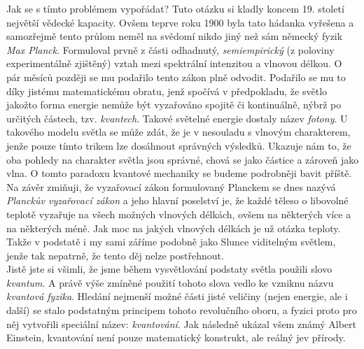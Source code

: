 \documentclass{../../../../style/mkimain}
\begin{document}
Jak se s tímto problémem vypořádat? Tuto otázku si kladly koncem 19. století největší vědecké kapacity.
Ovšem teprve roku 1900 byla tato hádanka vyřešena a samozřejmě tento průlom neměl na svědomí nikdo jiný než sám německý fyzik \textit{Max Planck}.
Formuloval prvně z části odhadnutý, \textit{semiempirický} (z poloviny experimentálně zjištěný) vztah mezi spektrální intenzitou a vlnovou délkou.
O pár měsíců později se mu podařilo tento zákon plně odvodit.
Podařilo se mu to díky jistému matematickému obratu, jenž spočívá v předpokladu,
že světlo jakožto forma energie nemůže být vyzařováno spojitě či kontinuálně, nýbrž po určitých částech, tzv. \textit{kvantech}.
Takové  světelné energie dostaly název \textit{fotony}.
U takového modelu světla se může zdát, že je v nesouladu s vlnovým charakterem, jenže pouze tímto trikem lze dosáhnout správných výsledků.
Ukazuje nám to, že oba pohledy na charakter světla jsou správné, chová se jako částice a zároveň jako vlna.
O tomto paradoxu kvantové mechaniky se budeme podrobněji bavit příště. Na závěr zmiňuji,
že vyzařovací zákon formulovaný Planckem se dnes nazývá \textit{Planckův vyzařovací zákon} a jeho hlavní poselství je,
že každé těleso o libovolné teplotě vyzařuje na všech možných vlnových délkách, ovšem na některých více a na některých méně.
Jak moc na jakých vlnových délkách je už otázka teploty. Takže v podstatě i my sami záříme podobně jako Slunce viditelným světlem,
jenže tak nepatrně, že tento děj nelze postřehnout.
\\

Jistě jste si všimli, že jsme během vysvětlování podstaty světla použili slovo \textit{kvantum}.
A právě výše zmíněné použití tohoto slova vedlo ke vzniknu názvu \textit{kvantová fyzika}.
Hledání nejmenší možné části jisté veličiny (nejen energie, ale i další) se stalo podstatným principem tohoto revolučního oboru,
a fyzici proto pro něj vytvořili speciální název: \textit{kvantování}.
Jak následně ukázal všem známý Albert Einstein, kvantování není pouze matematický konstrukt, ale reálný jev přírody.
\end{document}
